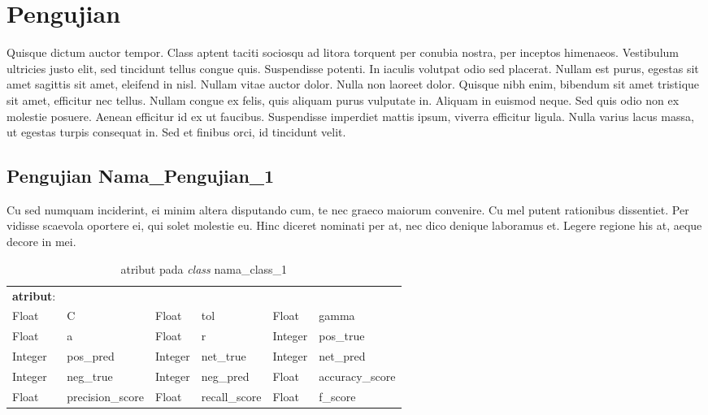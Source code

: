 \section{Pengujian}
Quisque dictum auctor tempor. Class aptent taciti sociosqu ad litora torquent per conubia nostra, per inceptos himenaeos. Vestibulum ultricies justo elit, sed tincidunt tellus congue quis. Suspendisse potenti. In iaculis volutpat odio sed placerat. Nullam est purus, egestas sit amet sagittis sit amet, eleifend in nisl. Nullam vitae auctor dolor. Nulla non laoreet dolor. Quisque nibh enim, bibendum sit amet tristique sit amet, efficitur nec tellus. Nullam congue ex felis, quis aliquam purus vulputate in. Aliquam in euismod neque. Sed quis odio non ex molestie posuere. Aenean efficitur id ex ut faucibus. Suspendisse imperdiet mattis ipsum, viverra efficitur ligula. Nulla varius lacus massa, ut egestas turpis consequat in. Sed et finibus orci, id tincidunt velit.\\

\subsection{Pengujian Nama\_Pengujian\_1}
Cu sed numquam inciderint, ei minim altera disputando cum, te nec graeco maiorum convenire.
Cu mel putent rationibus dissentiet. Per vidisse scaevola oportere ei, qui solet molestie eu. Hinc diceret nominati per at, nec dico denique laboramus et. Legere regione his at, aeque decore in mei.\\

\begin{small}
	\begin{longtable}[c]{|p{1.5cm} p{2.3cm} p{1.5cm} p{2.3cm} p{1.5cm} p{2.3cm}|}
		\caption{atribut pada \textit{class} nama\_class\_1}\\
		\hline
		
		\textbf{atribut}: & & & & &\\
		Float & C & Float & tol & Float & gamma \\ 
		Float & a & Float & r & Integer & pos\_true \\ 
		Integer & pos\_pred & Integer & net\_true & Integer & net\_pred \\ 
		Integer & neg\_true & Integer & neg\_pred & Float & accuracy\_score \\ 
		Float & precision\_score & Float & recall\_score & Float & f\_score \\ \hline
		
	\end{longtable}
\end{small}

